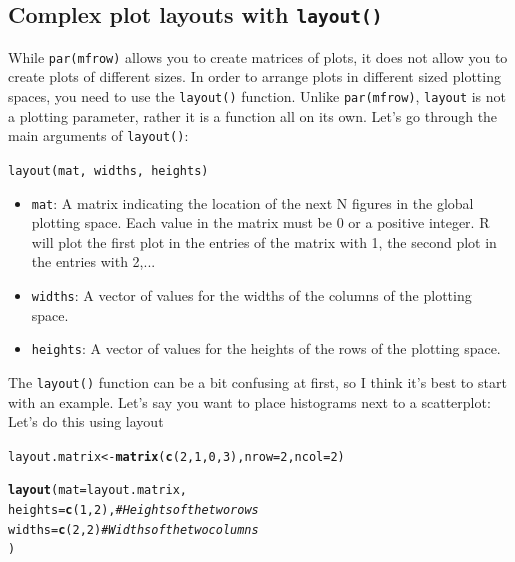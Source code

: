\documentclass{tufte-book}\usepackage[]{graphicx}\usepackage[]{color}
\makeatletter
\newcommand{\hlnum}[1]{\textcolor[rgb]{0.686,0.059,0.569}{#1}}%
\newcommand{\hlcom}[1]{\textcolor[rgb]{0.678,0.584,0.686}{\textit{#1}}}%
\newcommand{\hlstd}[1]{\textcolor[rgb]{0.345,0.345,0.345}{#1}}%
\newcommand{\hlkwb}[1]{\textcolor[rgb]{0.69,0.353,0.396}{#1}}%
\newcommand{\hlkwc}[1]{\textcolor[rgb]{0.333,0.667,0.333}{#1}}%
\newcommand{\hlkwd}[1]{\textcolor[rgb]{0.737,0.353,0.396}{\textbf{#1}}}%
\newenvironment{kframe}{%
 \def\at@end@of@kframe{}%
 \ifinner\ifhmode%
  \def\at@end@of@kframe{\end{minipage}}%
  \begin{minipage}{\columnwidth}%
 \fi\fi%
 \def\FrameCommand##1{\hskip\@totalleftmargin \hskip-\fboxsep
 \colorbox{shadecolor}{##1}\hskip-\fboxsep
     \hskip-\linewidth \hskip-\@totalleftmargin \hskip\columnwidth}%
 \MakeFramed {\advance\hsize-\width
   \@totalleftmargin\z@ \linewidth\hsize
   \@setminipage}}%
 {\par\unskip\endMakeFramed%
 \at@end@of@kframe}
\newenvironment{knitrout}{}{} %
\newcommand{\newfun}[1]{\begin{LARGE} \begin{center} \texttt{#1} \end{center} \end{LARGE}}
\makeatother
\begin{document}
\begin{footnotesize}
\subsection{Complex plot layouts with \texttt{layout()}}

While \texttt{par(mfrow)} allows you to create matrices of plots, it does not allow you to create plots of different sizes. In order to arrange plots in different sized plotting spaces, you need to use the \texttt{layout()} function. Unlike \texttt{par(mfrow)}, \texttt{layout} is not a plotting parameter, rather it is a function all on its own. Let's go through the main arguments of \texttt{layout()}:

\newfun{layout(mat, widths, heights)}

\begin{itemize}

  \item \texttt{mat}: A matrix indicating the location of the next N figures in the global plotting space. Each value in the matrix must be 0 or a positive integer. R will plot the first plot in the entries of the matrix with 1, the second plot in the entries with 2,...
  \item \texttt{widths}: A vector of values for the widths of the columns of the plotting space.
  \item \texttt{heights}: A vector of values for the heights of the rows of the plotting space.

\end{itemize}

The \texttt{layout()} function can be a bit confusing at first, so I think it's best to start with an example. Let's say you want to place histograms next to a scatterplot: Let's do this using layout

\begin{marginfigure}
\begin{tiny}
\begin{knitrout}
\color{fgcolor}\begin{kframe}
\begin{alltt}
\hlstd{layout.matrix} \hlkwb{<-} \hlkwd{matrix}\hlstd{(}\hlkwd{c}\hlstd{(}\hlnum{2}\hlstd{,} \hlnum{1}\hlstd{,} \hlnum{0}\hlstd{,} \hlnum{3}\hlstd{),} \hlkwc{nrow} \hlstd{=} \hlnum{2}\hlstd{,} \hlkwc{ncol} \hlstd{=} \hlnum{2}\hlstd{)}

\hlkwd{layout}\hlstd{(}\hlkwc{mat} \hlstd{= layout.matrix,}
       \hlkwc{heights} \hlstd{=} \hlkwd{c}\hlstd{(}\hlnum{1}\hlstd{,} \hlnum{2}\hlstd{),} \hlcom{# Heights of the two rows}
       \hlkwc{widths} \hlstd{=} \hlkwd{c}\hlstd{(}\hlnum{2}\hlstd{,} \hlnum{2}\hlstd{)} \hlcom{# Widths of the two columns}
       \hlstd{)}


\end{alltt}
\end{kframe}
\end{knitrout}
\end{tiny}
\end{marginfigure}
\end{footnotesize}
\end{document}
